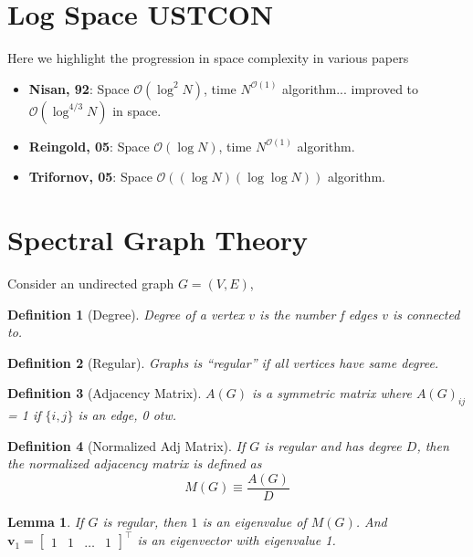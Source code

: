 \documentclass[11pt]{book}
\newcommand{\bv}{\mathbf{v}}
\newtheorem{definition}{Definition}[chapter]
\newtheorem{lemma}[theorem]{Lemma}
\begin{document}
\section{Log Space USTCON}
Here we highlight the progression in space complexity in various papers
\begin{itemize}
	\item \textbf{Nisan, 92}: Space $\mathcal O (\log ^ 2 N)$, time $N ^{\mathcal O (1)}$ algorithm... improved to $\mathcal O (\log ^ {4/3} N)$ in space. 
	\item \textbf{Reingold, 05}: Space $\mathcal O (\log N)$, time $N ^{\mathcal O (1)}$ algorithm. 
	\item \textbf{Trifornov, 05}: Space $\mathcal O ((\log N )(\log\log N))$ algorithm. 
\end{itemize}


\section{Spectral Graph Theory}
Consider an undirected graph $G = (V, E)$, 
\begin{definition}[Degree]
	Degree of a vertex $v$ is the number f edges $v$ is connected to.
\end{definition}

\begin{definition}[Regular]
	Graphs is ``regular'' if all vertices have same degree. 
\end{definition}

\begin{definition}[Adjacency Matrix]
	$A(G)$ is a symmetric matrix where $A(G)_{ij}$ = 1 if $\{i, j\}$ is an edge, 0 otw. 
\end{definition}

\begin{definition}[Normalized Adj Matrix]
	If $G$ is regular and has degree $D$, then the normalized adjacency matrix is defined as 
	\begin{equation}
		M(G) \equiv \frac{A(G)}{D}
	\end{equation}
\end{definition}

\begin{lemma}
	If $G$ is regular, then $1$ is an eigenvalue of $M(G)$. And $\bv_1 = \begin{bmatrix}
		1 & 1 & \dots & 1
	\end{bmatrix}^\top$ is an eigenvector with eigenvalue 1. 
\end{lemma}
\end{document}
